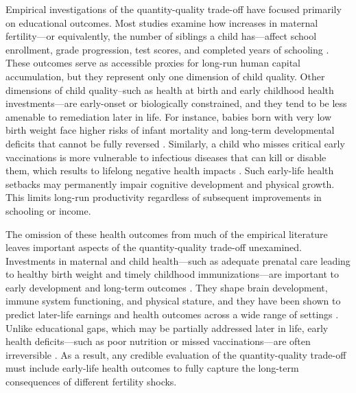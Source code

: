 \documentclass[]{AEA}
\begin{document}
Empirical investigations of the quantity-quality trade-off have focused
primarily on educational outcomes. Most studies examine how increases in
maternal fertility---or equivalently, the number of siblings a child
has---affect school enrollment, grade progression, test scores, and
completed years of schooling
\citep{rosenzweig1980testing, black2005more, angrist2010multiple}. These
outcomes serve as accessible proxies for long-run human capital
accumulation, but they represent only one dimension of child quality.
Other dimensions of child quality--such as health at birth and early
childhood health investments---are early-onset or biologically
constrained, and they tend to be less amenable to remediation later in
life. For instance, babies born with very low birth weight face higher
risks of infant mortality and long-term developmental deficits that
cannot be fully reversed \citep{cook2015understanding}. Similarly, a
child who misses critical early vaccinations is more vulnerable to
infectious diseases that can kill or disable them, which results to
lifelong negative health impacts \citep{costa2024child}. Such early-life
health setbacks may permanently impair cognitive development and
physical growth. This limits long-run productivity regardless of
subsequent improvements in schooling or income.

The omission of these health outcomes from much of the empirical
literature leaves important aspects of the quantity-quality trade-off
unexamined. Investments in maternal and child health---such as adequate
prenatal care leading to healthy birth weight and timely childhood
immunizations---are important to early development and long-term
outcomes \citep{victora2008maternal, hoddinott2013adult}. They shape
brain development, immune system functioning, and physical stature, and
they have been shown to predict later-life earnings and health outcomes
across a wide range of settings
\citep{grantham2007development, alderman2006long}. Unlike educational
gaps, which may be partially addressed later in life, early health
deficits---such as poor nutrition or missed vaccinations---are often
irreversible \citep{victora2008maternal, hoddinott2013adult}. As a
result, any credible evaluation of the quantity-quality trade-off must
include early-life health outcomes to fully capture the long-term
consequences of different fertility shocks.
\end{document}
